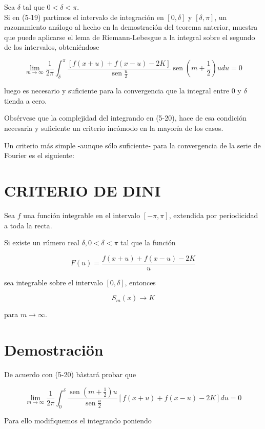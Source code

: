 \documentclass[10pt]{article}
\theoremstyle{plain}
\theoremstyle{definition}
\theoremstyle{remark}
\begin{document}
Sea $\delta$ tal que $0<\delta<\pi$.\\
Si en (5-19) partimos el intervalo de integración en $[0, \delta]$ y $[\delta, \pi]$, un razonamiento análogo al hecho en la demostración del teorema anterior, muestra que puede aplicarse el lema de Riemann-Lebesgue a la integral sobre el segundo de los intervalos, obteniéndose


\begin{equation*}
\lim _{m \rightarrow \infty} \frac{1}{2 \pi} \int_{\delta}^{\pi} \frac{[f(x+u)+f(x-u)-2 K]}{\operatorname{sen} \frac{u}{2}} \operatorname{sen}\left(m+\frac{1}{2}\right) u d u=0 \tag{5-20}
\end{equation*}


luego es necesario y suficiente para la convergencia que la integral entre 0 y $\delta$ tienda a cero.

Obsérvese que la complejidad del integrando en (5-20), hace de esa condición necesaria y suficiente un criterio incómodo en la mayoría de los casos.

Un criterio más simple -aunque sólo suficiente- para la convergencia de la serie de Fourier es el siguiente:

\section*{CRITERIO DE DINI}
Sea $f$ una función integrable en el intervalo $[-\pi, \pi]$, extendida por periodicidad a toda la recta.

Si existe un rúmero real $\delta, 0<\delta<\pi$ tal que la función

$$
F(u)=\frac{f(x+u)+f(x-u)-2 K}{u}
$$

sea integrable sobre el intervalo $[0, \delta]$, entonces

$$
S_{m}(x) \rightarrow K
$$

para $m \rightarrow \infty$.

\section*{Demostraciön}
De acuerdo con (5-20) bàstará probar que


\begin{equation*}
\lim _{m \rightarrow \infty} \frac{1}{2 \pi} \int_{0}^{\delta} \frac{\operatorname{sen}\left(m+\frac{1}{2}\right) u}{\operatorname{sen} \frac{u}{2}}[f(x+u)+f(x-u)-2 K] d u=0 \tag{5-21}
\end{equation*}


Para ello modifiquemos el integrando poniendo
\end{document}
